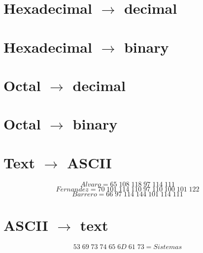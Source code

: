 \documentclass[12pt]{article}
\begin{document}
\section{Hexadecimal \(\to\) decimal}

\section{Hexadecimal \(\to\) binary}

\section{Octal \(\to\) decimal}

\section{Octal \(\to\) binary}

\section{Text \(\to\) ASCII}

\[
    Alvaro = 65\;108\;118\;97\;114\;111
\]
\[
    Fernandez = 70\;101\;114\;110\;97\;110\;100\;101\;122
\]
\[
    Barrero = 66\;97\;114\;144\;101\;114\;111
\]

\section{ASCII \(\to\) text}

\[
    53\;69\;73\;74\;65\;6D\;61\;73 = Sistemas
\]
\end{document}
